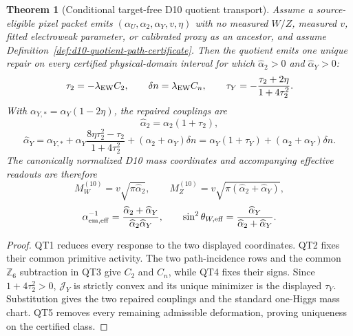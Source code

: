 \documentclass[11pt]{article}
\newtheorem{theorem}{Theorem}[section]
\begin{document}
\begin{theorem}[Conditional target-free D10 quotient
transport]\label{thm:conditional-d10-quotient-transport}
Assume a source-eligible pixel packet emits
\((\alpha_U,\alpha_2,\alpha_Y,v,\eta)\) with no measured \(W/Z\), measured
\(v\), fitted electroweak parameter, or calibrated proxy as an ancestor, and
assume Definition~\ref{def:d10-quotient-path-certificate}.  Then the quotient
emits one unique repair on every certified physical-domain interval for which
\(\widehat\alpha_2>0\) and \(\widehat\alpha_Y>0\):
\[
\tau_2=-\lambda_{\rm EW}C_2,
\qquad
\delta n=\lambda_{\rm EW}C_n,
\qquad
\tau_Y=-\frac{\tau_2+2\eta}{1+4\tau_2^2}.
\]
With \(\alpha_{Y,*}=\alpha_Y(1-2\eta)\), the repaired couplings are
\[
\widehat\alpha_2=\alpha_2(1+\tau_2),
\]
\[
\widehat\alpha_Y
=\alpha_{Y,*}
+\alpha_Y\frac{8\eta\tau_2^2-\tau_2}{1+4\tau_2^2}
+(\alpha_2+\alpha_Y)\delta n
=\alpha_Y(1+\tau_Y)+(\alpha_2+\alpha_Y)\delta n.
\]
The canonically normalized D10 mass coordinates and accompanying effective
readouts are therefore
\[
M_W^{(10)}=v\sqrt{\pi\widehat\alpha_2},
\qquad
M_Z^{(10)}=v\sqrt{\pi(\widehat\alpha_2+\widehat\alpha_Y)},
\]
\[
\alpha_{\rm em,eff}^{-1}
=\frac{\widehat\alpha_2+\widehat\alpha_Y}
{\widehat\alpha_2\widehat\alpha_Y},
\qquad
\sin^2\theta_{W,\rm eff}
=\frac{\widehat\alpha_Y}{\widehat\alpha_2+\widehat\alpha_Y}.
\]
\end{theorem}

\begin{proof}
QT1 reduces every response to the two displayed coordinates.  QT2 fixes their
common primitive activity.  The two path-incidence rows and the common
\(\mathbb Z_6\) subtraction in QT3 give \(C_2\) and \(C_n\), while QT4 fixes
their signs.  Since \(1+4\tau_2^2>0\), \(\mathcal J_Y\) is strictly convex and
its unique minimizer is the displayed \(\tau_Y\).  Substitution gives the two
repaired couplings and the standard one-Higgs mass chart.  QT5 removes every
remaining admissible deformation, proving uniqueness on the certified class.
\end{proof}
\end{document}
